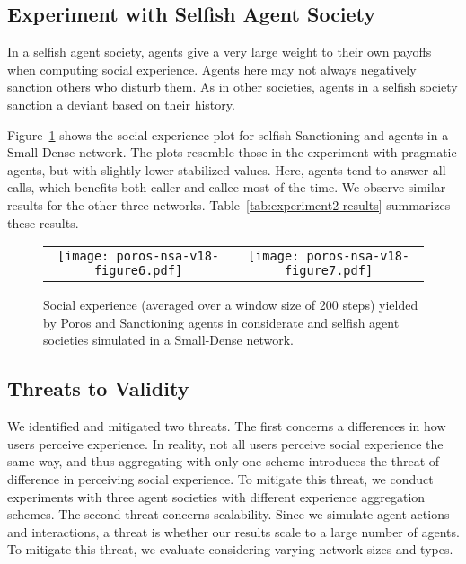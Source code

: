 \subsection{Experiment with Selfish Agent Society} 
In a selfish agent society, agents give a very large weight to their own payoffs 
when computing social experience. Agents here may not always negatively sanction 
others who disturb them. As in other societies, agents in a selfish society sanction a deviant based on their history.

Figure~\ref{fig:experiment2-considerate-selfish}
shows the social experience plot for selfish Sanctioning and \frameworkB agents
in a Small-Dense network. The plots resemble those in the
experiment with pragmatic agents, but with slightly lower stabilized
values. Here, agents tend to answer all calls, which benefits both
caller and callee most of the time. We observe similar results for the
other three networks. Table~\ref{tab:experiment2-results} summarizes
these results. 

\begin{figure}[!tb]
\centering
    
\begin{tabular}{@{}cc@{}}

\texttt{[image: poros-nsa-v18-figure6.pdf]}
&
\texttt{[image: poros-nsa-v18-figure7.pdf]}
\end{tabular}
\caption[Social experience plots for considerate and selfish agents]{Social experience (averaged over a window size of 200 steps)
yielded by Poros and Sanctioning agents in considerate and selfish agent societies simulated in a Small-Dense network.}
\label{fig:experiment2-considerate-selfish}

\end{figure}

\subsection{Threats to Validity}

We identified and mitigated two threats. The first concerns
a differences in how users perceive experience.
In reality, not all users perceive social experience the same way, and thus aggregating with only one scheme introduces the threat of difference in perceiving social experience. To mitigate this threat, we conduct experiments with three agent societies with different experience aggregation schemes.
%
The second threat concerns scalability. Since we simulate agent actions and interactions, a threat is whether our results scale to a large number of agents. To mitigate this threat, we evaluate \frameworkB considering varying network sizes and types. 

